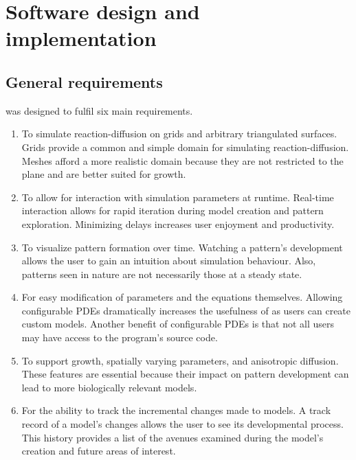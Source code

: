 \chapter{Software design and  implementation}
\section{General requirements} %
\ProgramName{} was designed to fulfil six main requirements.

\begin{enumerate}
	\item To simulate reaction-diffusion on grids and arbitrary triangulated surfaces. Grids provide a common and simple domain for simulating reaction-diffusion. Meshes afford a more realistic domain because they are not restricted to the plane and are better suited for growth. 

	\item To allow for interaction with simulation parameters at runtime. Real-time interaction allows for rapid iteration during model creation and pattern exploration. Minimizing delays increases user enjoyment and productivity. %

	\item To visualize pattern formation over time. Watching a pattern's development allows the user to gain an intuition about simulation behaviour. Also, patterns seen in nature are not necessarily those at a steady state.
	
	\item For easy modification of parameters and the equations themselves. Allowing configurable PDEs dramatically increases the usefulness of \ProgramName{} as users can create custom models. Another benefit of configurable PDEs is that not all users may have access to the program's source code. 
		
	\item To support growth, spatially varying parameters, and anisotropic diffusion. These features are essential because their impact on pattern development can lead to more biologically relevant models. 
	
	\item For the ability to track the incremental changes made to models. A track record of a model's changes allows the user to see its developmental process. This history provides a list of the avenues examined during the model's creation and future areas of interest.
\end{enumerate}


